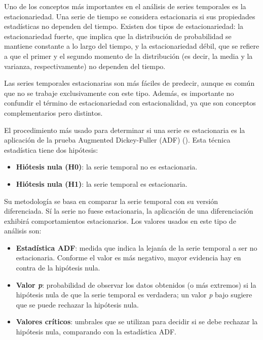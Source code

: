 \documentclass[12pt,a4paper]{report}
\begin{document}
Uno de los conceptos más importantes en el análisis de series temporales es la estacionariedad. Una serie de tiempo se considera estacionaria si sus propiedades estadísticas no dependen del tiempo. Existen dos tipos de estacionariedad: la estacionariedad fuerte, que implica que la distribución de probabilidad se mantiene constante a lo largo del tiempo, y la estacionariedad débil, que se refiere a que el primer y el segundo momento de la distribución (es decir, la media y la varianza, respectivamente) no dependen del tiempo.

Las series temporales estacionarias son más fáciles de predecir, aunque es común que no se trabaje exclusivamente con este tipo. Además, es importante no confundir el término de estacionariedad con estacionalidad, ya que son conceptos complementarios pero distintos. 

El procedimiento más usado para determinar si una serie es estacionaria es la aplicación de la prueba Augmented Dickey-Fuller (ADF) (\cite{jacomeGarcia2024}). Esta técnica estadística tiene dos hipótesis:

\begin{itemize}
    \item \textbf{Hiótesis nula (H0)}: la serie temporal no es estacionaria.

    \item \textbf{Hiótesis nula (H1)}: la serie temporal es estacionaria.
\end{itemize}

Su metodología se basa en comparar la serie temporal con su versión diferenciada. Sí la serie no fuese estacionaria, la aplicación de una diferenciación exhibirá comportamientos estacionarios. Los valores usados en este tipo de análisis son:

\begin{itemize}
    \item \textbf{Estadística ADF}: medida que indica la lejanía de la serie temporal a ser no estacionaria. Conforme el valor es más negativo, mayor evidencia hay en contra de la hipótesis nula.

    \item \textbf{Valor \textit{p}}: probabilidad de observar los datos obtenidos (o más extremos) si la hipótesis nula de que la serie temporal es verdadera; un valor \textit{p} bajo sugiere que se puede rechazar la hipótesis nula.

    \item \textbf{Valores críticos}: umbrales que se utilizan para decidir si se debe rechazar la hipótesis nula, comparando con la estadística ADF.
\end{itemize}
\end{document}
